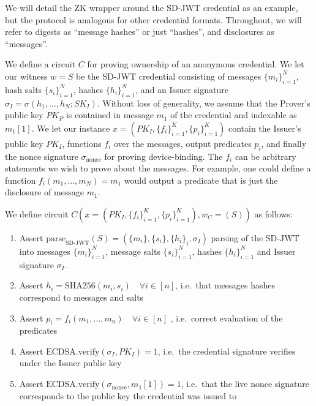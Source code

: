 We will detail the ZK wrapper around the SD-JWT credential as an example, but the protocol is analogous for other credential formats. 
Throughout, we will refer to digests as ``message hashes'' or just ``hashes'', and disclosures as ``messages''.

We define a circuit $C$ for proving ownership of an anonymous credential. 
We let our witness $w = S$ be the SD-JWT credential consisting of messages $\{m_i\}_{i=1}^N$, hash salts $\{s_i\}_{i=1}^N$, 
hashes $\{h_i\}_{i=1}^N$, and an Issuer signature $\sigma_I = \sigma(h_1, \dots, h_N; SK_I)$. 
Without loss of generality, we assume that the Prover's public key $PK_P$ is contained in message $m_1$ of the credential and indexable as $m_1[1]$.
We let our instance $x = (PK_I, \{f_i\}_{i=1}^K, \{p_i\}_{i=1}^K)$ contain the Issuer's public key $PK_I$, functions $f_i$ over the messages, 
output predicates $p_i$, and finally the nonce signature $\sigma_{\text{nonce}}$ for proving device-binding. 
The $f_i$ can be arbitrary statements we wish to prove about the messages. For example, one could define a function $f_i(m_1, \dots, m_N) = m_1$ would output a predicate that is just the disclosure of message $m_1$.

\begin{mdframed}[style=zkprotocolwithheader, frametitle=Underlying ZK Circuit $C$ for Verifiable Credential]

We define circuit $C(x = (PK_I, \{f_i\}_{i=1}^K, \{p_i\}_{i=1}^K), w_C = (S))$ as follows:

\begin{enumerate}
\item Assert $\text{parse}_{\text{SD-JWT}}(S) = (\{m_i\}, \{s_i\}, \{h_i\}_i, \sigma_I)$ parsing of the SD-JWT into messages $\{m_i\}_{i=1}^N$, message salts $\{s_i\}_{i=1}^N$, hashes $\{h_i\}_{i=1}^N$ and Issuer signature $\sigma_I$.
\item Assert $h_i = \text{SHA256}(m_i, s_i) \quad \forall i \in [n]$, i.e.\ that messages hashes correspond to messages and salts
\item Assert $p_i = f_i(m_1, \dots, m_n) \quad \forall i \in [n]$ , i.e.\ correct evaluation of the predicates
\item Assert $\text{ECDSA.verify}(\sigma_I, PK_I) = 1$, i.e.\ the credential signature verifies under the Issuer public key
\item Assert $\text{ECDSA.verify}(\sigma_{\text{nonce}}, m_1[1]) = 1$, i.e.\ that the live nonce signature corresponds to the public key the credential was issued to
\end{enumerate}

\end{mdframed}

